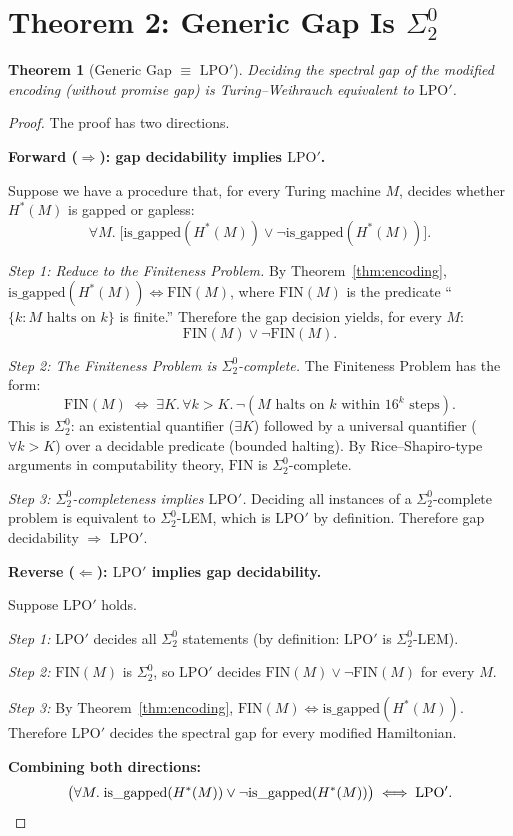 \documentclass[11pt,a4paper]{article}
\theoremstyle{plain}
\newtheorem{theorem}{Theorem}[section]
\theoremstyle{definition}
\newcommand{\LPOj}{\ensuremath{\mathrm{LPO'}}}
\begin{document}
\section{Theorem 2: Generic Gap Is $\Sigma_2^0$}\label{sec:sigma2}

\begin{theorem}[Generic Gap $\equiv$ $\LPOj$]\label{thm:sigma2}
Deciding the spectral gap of the modified encoding
(without promise gap) is Turing--Weihrauch equivalent to $\LPOj$.
\end{theorem}

\begin{proof}
The proof has two directions.

\medskip\noindent
\textbf{Forward ($\Rightarrow$): gap decidability implies $\LPOj$.}

Suppose we have a procedure that, for every Turing machine $M$,
decides whether $H^*(M)$ is gapped or gapless:
\[
  \forall M.\;
  \bigl[\text{is\_gapped}(H^*(M)) \lor
        \lnot\text{is\_gapped}(H^*(M))\bigr].
\]

\emph{Step 1: Reduce to the Finiteness Problem.}
By Theorem~\ref{thm:encoding}, $\text{is\_gapped}(H^*(M))
\Leftrightarrow \text{FIN}(M)$, where $\text{FIN}(M)$
is the predicate ``$\{k : M \text{ halts on } k\}$ is finite.''
Therefore the gap decision yields, for every $M$:
\[
  \text{FIN}(M) \lor \lnot\text{FIN}(M).
\]

\emph{Step 2: The Finiteness Problem is $\Sigma_2^0$-complete.}
The Finiteness Problem has the form:
\[
  \text{FIN}(M) \;\Longleftrightarrow\;
  \exists K.\, \forall k > K.\,
  \lnot(\text{$M$ halts on $k$ within $16^k$ steps}).
\]
This is $\Sigma_2^0$: an existential quantifier ($\exists K$)
followed by a universal quantifier ($\forall k > K$) over a
decidable predicate (bounded halting).
By Rice--Shapiro-type arguments in computability theory,
$\text{FIN}$ is $\Sigma_2^0$-complete.

\emph{Step 3: $\Sigma_2^0$-completeness implies $\LPOj$.}
Deciding all instances of a $\Sigma_2^0$-complete problem is
equivalent to $\Sigma_2^0$-LEM, which is $\LPOj$ by definition.
Therefore gap decidability $\Rightarrow$ $\LPOj$.

\medskip\noindent
\textbf{Reverse ($\Leftarrow$): $\LPOj$ implies gap decidability.}

Suppose $\LPOj$ holds.

\emph{Step 1:} $\LPOj$ decides all $\Sigma_2^0$ statements
(by definition: $\LPOj$ is $\Sigma_2^0$-LEM).

\emph{Step 2:} $\text{FIN}(M)$ is $\Sigma_2^0$,
so $\LPOj$ decides $\text{FIN}(M) \lor \lnot\text{FIN}(M)$
for every $M$.

\emph{Step 3:} By Theorem~\ref{thm:encoding},
$\text{FIN}(M) \Leftrightarrow \text{is\_gapped}(H^*(M))$.
Therefore $\LPOj$ decides the spectral gap for every
modified Hamiltonian.

\medskip\noindent
\textbf{Combining both directions:}
\[
  \bigl(\forall M.\;
  \text{is\_gapped}(H^*(M)) \lor
  \lnot\text{is\_gapped}(H^*(M))\bigr)
  \;\Longleftrightarrow\; \LPOj. \qedhere
\]
\end{proof}
\end{document}
